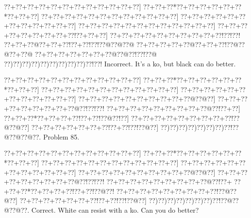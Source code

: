 \documentclass[a5paper]{article}
\begin{document}
\begin{center}
{\goo
\0??+\0??+\0??+\0??+\0??+\0??+\0??+\0??+\0??+\0??+\0??+\0??]
\0??+\0??+\0??*\0??+\0??+\0??+\0??+\0??+\0??*\0??+\0??+\0??]
\0??+\0??+\0??+\0??+\0??+\0??+\0??+\0??+\0??+\0??+\0??+\0??]
\0??+\0??+\0??+\0??+\0??+\0??+\0??+\0??+\0??+\0??+\0??+\0??]
\0??+\0??+\0??+\0??+\0??+\0??+\0??+\0??+\0??+\0??+\0??+\0??]
\0??+\0??+\0??+\0??+\0??+\0??+\0??+\0??+\0??!\0??+\0??+\0??]
\0??+\0??+\0??+\0??+\0??+\0??+\0??+\0??+\0??+\0??!\0??!\0??!
\0??+\0??+\0??@\0??+\0??+\0??!\0??+\0??!\0??!\0??@\0??@\0??@
\0??+\0??+\0??+\0??+\0??@\0??+\0??+\0??!\0??@\0??@\0??+\0??@
\0??+\0??+\0??+\0??+\0??+\0??+\0??@\0??@\0??!\0??!\0??@
\0??)\0??)\0??)\0??)\0??)\0??)\0??)\0??)\0??)\0??!\0??!
}
Incorrect. It's a ko, but black can do better.

\end{center}
\newpage
\begin{center}
{\goo
\0??+\0??+\0??+\0??+\0??+\0??+\0??+\0??+\0??+\0??+\0??+\0??]
\0??+\0??+\0??*\0??+\0??+\0??+\0??+\0??+\0??*\0??+\0??+\0??]
\0??+\0??+\0??+\0??+\0??+\0??+\0??+\0??+\0??+\0??+\0??+\0??]
\0??+\0??+\0??+\0??+\0??+\0??+\0??+\0??+\0??+\0??+\0??+\0??]
\0??+\0??+\0??+\0??+\0??+\0??+\0??+\0??+\0??+\0??@\0??@\0??]
\0??+\0??+\0??+\0??+\0??+\0??+\0??+\0??+\0??@\0??!\0??!\0??!
\0??+\0??+\0??+\0??+\0??+\0??+\0??+\0??+\0??@\0??!\0??+\0??]
\0??+\0??+\0??*\0??+\0??+\0??+\0??!\0??+\0??!\0??@\0??!\0??]
\0??+\0??+\0??+\0??+\0??+\0??+\0??+\0??+\0??!\0??@\0??@\0??]
\0??+\0??+\0??+\0??+\0??+\0??+\0??!\0??+\0??!\0??!\0??@\0??]
\0??)\0??)\0??)\0??)\0??)\0??)\0??)\0??!\0??@\0??@\0??@\0??.
}
Problem 85.

\end{center}
\begin{center}
{\goo
\0??+\0??+\0??+\0??+\0??+\0??+\0??+\0??+\0??+\0??+\0??+\0??]
\0??+\0??+\0??*\0??+\0??+\0??+\0??+\0??+\0??*\0??+\0??+\0??]
\0??+\0??+\0??+\0??+\0??+\0??+\0??+\0??+\0??+\0??+\0??+\0??]
\0??+\0??+\0??+\0??+\0??+\0??+\0??+\0??+\0??+\0??+\0??+\0??]
\0??+\0??+\0??+\0??+\0??+\0??+\0??+\0??+\0??+\0??@\0??@\0??]
\0??+\0??+\0??+\0??+\0??+\0??+\0??+\0??+\0??@\0??!\0??!\0??!
\0??+\0??+\0??+\0??+\0??+\0??+\0??+\0??+\0??@\0??!\0??+
\0??+\0??+\0??*\0??+\0??+\0??+\0??!\0??+\0??!\0??@\0??!
\0??+\0??+\0??+\0??+\0??+\0??+\0??+\0??+\0??!\0??@\0??@\0??]
\0??+\0??+\0??+\0??+\0??+\0??+\0??!\0??+\0??!\0??!\0??@\0??]
\0??)\0??)\0??)\0??)\0??)\0??)\0??)\0??!\0??@\0??@\0??@\0??.
}
Correct. White can resist with a ko. Can you do better?

\end{center}
\end{document}
